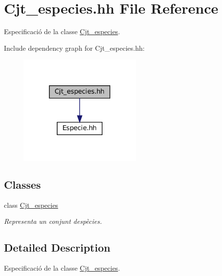 \hypertarget{_cjt__especies_8hh}{}\section{Cjt\+\_\+especies.\+hh File Reference}
\label{_cjt__especies_8hh}


Especificació de la classe \hyperlink{class_cjt__especies}{Cjt\+\_\+especies}.  


Include dependency graph for Cjt\+\_\+especies.\+hh\+:\nopagebreak
\begin{figure}[H]
\begin{center}
\leavevmode
\includegraphics[width=173pt]{_cjt__especies_8hh__incl}
\end{center}
\end{figure}
\subsection*{Classes}
\begin{DoxyCompactItemize}
\item 
class \hyperlink{class_cjt__especies}{Cjt\+\_\+especies}
\begin{DoxyCompactList}\small\item\em Representa un conjunt d\textquotesingle{}espècies. \end{DoxyCompactList}\end{DoxyCompactItemize}


\subsection{Detailed Description}
Especificació de la classe \hyperlink{class_cjt__especies}{Cjt\+\_\+especies}. 

